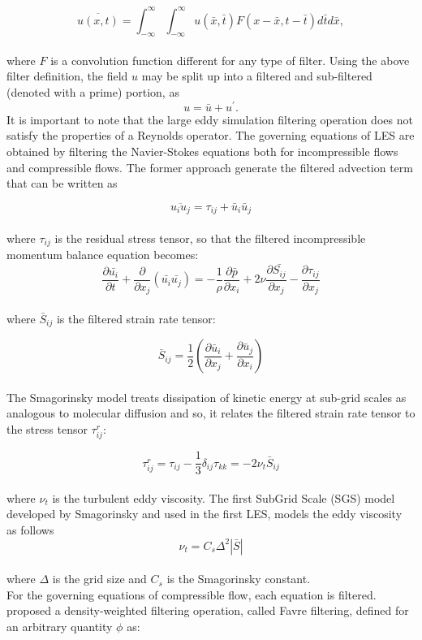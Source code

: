 \documentclass[a5paper]{sapthesis}
\begin{document}
 	\begin{equation}
 			\overline{u(x,t)} = \int_{-\infty}^{\infty} \int_{-\infty}^{\infty} u(\bar{x},\bar{t})F(x-\bar{x},t-\bar{t}) d\bar{t} d\bar{x},
 	\end{equation}
 	\\
 	where $F$ is a convolution function different for any type of filter. Using the above filter definition, the field $u$ may be split up into a filtered and sub-filtered (denoted with a prime) portion, as 
 	\begin{equation}
 		{u ={\bar{u}}+u^{\prime }.}
 	\end{equation}
 	It is important to note that the large eddy simulation filtering operation does not satisfy the properties of a Reynolds operator. 
 	The governing equations of LES are obtained by filtering the Navier-Stokes equations both for incompressible flows and compressible flows. 
	The former approach generate the filtered advection term that can be written as 
	
	\begin{equation}
		\overline{u_i u_j} = \tau_{ij} + \bar{u}_i\bar{u}_j
	\end{equation}
	\\
	where $\tau_{ij}$ is the residual stress tensor, so that the filtered incompressible momentum balance equation becomes: 
	\begin{equation}
				\frac{\partial{\bar{u_i}}}{\partial{t}} + \frac{\partial}{\partial{x_j}} (\bar{u_i}\bar{u_j}) = -\frac{1}{\rho}\frac{\partial{\bar{p}}}{\partial{x_i}} + 2\nu \frac{\partial{\bar{S_{ij}}}}{\partial{x_j}} -\frac{\partial{\tau_{ij}}}{\partial{x_j}}
	\end{equation}
	\\
	where $\bar{S}_{ij}$ is the filtered strain rate tensor:
	
	\begin{equation}
		\bar{S}_{ij} = \frac{1}{2}\left(\frac{\partial \bar{u}_i}{\partial x_j} + \frac{\partial \bar{u}_j}{\partial x_i}\right)
	\end{equation}
	\\
	The Smagorinsky model treats dissipation of kinetic energy at sub-grid scales as analogous to molecular diffusion and so, it relates the filtered strain rate tensor to the stress tensor $\tau_{ij}^r$:
	
	\begin{equation}
		\tau_{ij}^r = \tau_{ij} - \frac{1}{3}\delta_{ij}\tau_{kk} = -2 \nu_t \bar{S}_{ij}
	\end{equation}
	\\
	where $\nu_t$ is the turbulent eddy viscosity. The first SubGrid Scale (SGS) model developed by Smagorinsky and used in the first LES,  models the eddy viscosity as follows
	\begin{equation}
		\nu_t = C_s \Delta^2|\bar{S}|
	\end{equation}
	\\
	where $\Delta$ is the grid size and $C_s$ is the Smagorinsky constant.
	\\
	For the governing equations of compressible flow, each equation is filtered.
	\citet{Favre} proposed a density-weighted filtering operation, called Favre filtering, defined for an arbitrary quantity $\phi$ as:
	
\end{document}
